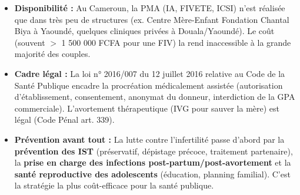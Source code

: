 \documentclass[11pt]{article}
\begin{document}
\begin{savaistu}
\begin{itemize}
\item \textbf{Disponibilité :} Au Cameroun, la PMA (IA, FIVETE, ICSI) n'est réalisée que dans très peu de structures (ex. Centre Mère-Enfant Fondation Chantal Biya à Yaoundé, quelques cliniques privées à Douala/Yaoundé). Le coût (souvent $>$ 1 500 000 FCFA pour une FIV) la rend inaccessible à la grande majorité des couples.
\item \textbf{Cadre légal :} La loi n° 2016/007 du 12 juillet 2016 relative au Code de la Santé Publique encadre la procréation médicalement assistée (autorisation d'établissement, consentement, anonymat du donneur, interdiction de la GPA commerciale). L'avortement thérapeutique (IVG pour sauver la mère) est légal (Code Pénal art. 339).
\item \textbf{Prévention avant tout :} La lutte contre l'infertilité passe d'abord par la \textbf{prévention des IST} (préservatif, dépistage précoce, traitement partenaire), la \textbf{prise en charge des infections post-partum/post-avortement} et la \textbf{santé reproductive des adolescents} (éducation, planning familial). C'est la stratégie la plus coût-efficace pour la santé publique.
\end{itemize}
\end{savaistu}
\end{document}
